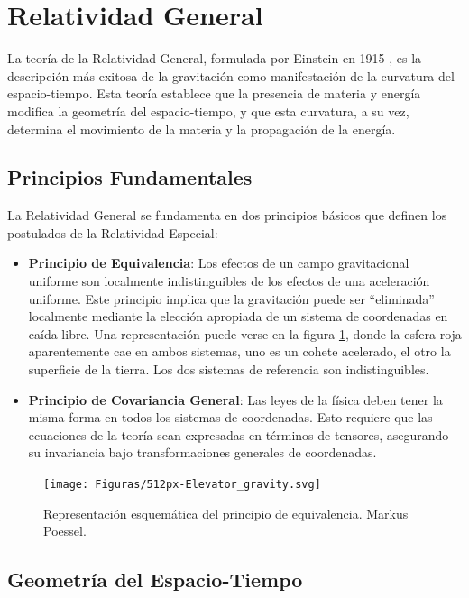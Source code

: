 \section{Relatividad General}

La teoría de la Relatividad General, formulada por Einstein en 1915 \cite{einsteinFeldgleichungenGravitation1915}, es la descripción más exitosa de la gravitación como manifestación de la curvatura del espacio-tiempo. Esta teoría establece que la presencia de materia y energía modifica la geometría del espacio-tiempo, y que esta curvatura, a su vez, determina el movimiento de la materia y la propagación de la energía.

\subsection{Principios Fundamentales}

La Relatividad General se fundamenta en dos principios básicos que definen los postulados de la Relatividad Especial:

\begin{itemize}
	\item \textbf{Principio de Equivalencia}: Los efectos de un campo gravitacional uniforme son localmente indistinguibles de los efectos de una aceleración uniforme. Este principio implica que la gravitación puede ser ``eliminada'' localmente mediante la elección apropiada de un sistema de coordenadas en caída libre. Una representación puede verse en la figura \ref{fig:equivalence_principle}, donde la esfera roja aparentemente cae en ambos sistemas, uno es un cohete acelerado, el otro la superficie de la tierra. Los dos sistemas de referencia son indistinguibles.
	
	\item \textbf{Principio de Covariancia General}: Las leyes de la física deben tener la misma forma en todos los sistemas de coordenadas. Esto requiere que las ecuaciones de la teoría sean expresadas en términos de tensores, asegurando su invariancia bajo transformaciones generales de coordenadas.
\end{itemize}

\begin{figure}[h]
	\centering
	\texttt{[image: Figuras/512px-Elevator\_gravity.svg]}
	\caption{Representación esquemática del principio de equivalencia. Markus Poessel.}
	\label{fig:equivalence_principle}
\end{figure}


\subsection{Geometría del Espacio-Tiempo}

